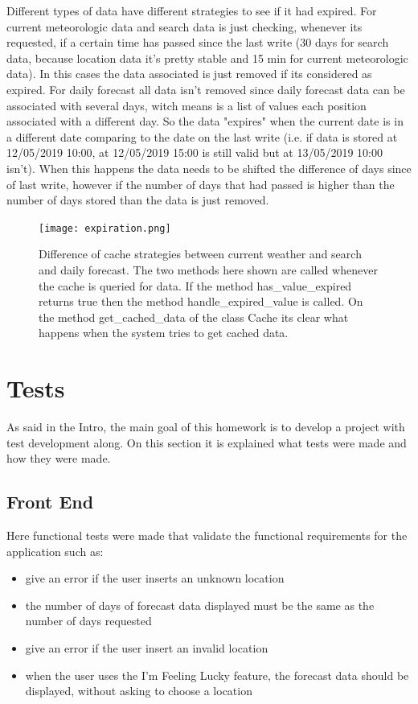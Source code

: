 \documentclass[12pt]{article}
\begin{document}
Different types of data have different strategies to see if it had expired. For current meteorologic data
  and search data is just checking, whenever its requested, if a certain time has passed since the
  last write (30 days for search data, because location data it's pretty stable and 15 min for
  current meteorologic data). In this cases the data associated is just removed if its considered as
  expired. For daily forecast all data isn't removed since daily forecast data can be associated
  with several days, witch means is a list of values each position associated with a different day. So the data
  "expires" when the current date is in a different date comparing to the date on the last write (i.e. if
  data is stored at 12/05/2019 10:00, at 12/05/2019 15:00 is still valid but at 13/05/2019 10:00 isn't).
  When this happens the data needs to be shifted the difference of days since of last write, however if
  the number of days that had passed is higher than the number of days stored than the data is just removed.

\begin{figure}[h]
  \center
  \texttt{[image: expiration.png]}
  \caption{Difference of cache strategies between current weather and search and daily forecast.
    The two methods here shown are called whenever the cache is queried for data. If the
    method has\_value\_expired returns true then the method handle\_expired\_value is called. On the method
    get\_cached\_data of the class Cache its clear what happens when the system tries to get
    cached data.}
\end{figure}

\section{Tests}

As said in the Intro, the main goal of this homework is to develop a project with
  test development along. On this section it is explained what tests were made
  and how they were made.

\subsection{Front End}

Here functional tests were made that validate the functional requirements for the application such as:
\begin{itemize}
  \item give an error if the user inserts an unknown location
  \item the number of days of forecast data displayed must be the same as the number
    of days requested
  \item give an error if the user insert an invalid location
  \item when the user uses the I'm Feeling Lucky feature, the forecast data should be
    displayed, without asking to choose a location
\end{itemize}
\end{document}
